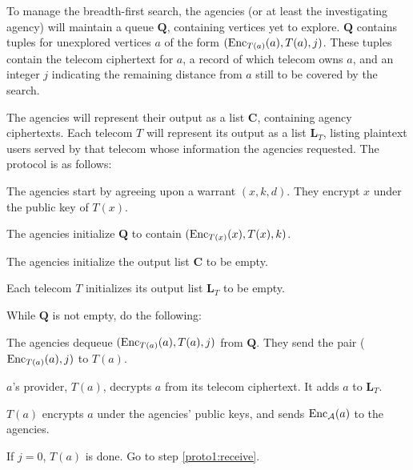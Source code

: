 To manage the breadth-first search, the agencies (or at least the investigating agency) will maintain a queue $\mathbf{Q}$, containing vertices yet to explore. $\mathbf{Q}$ contains tuples for unexplored vertices $a$ of the form $(\operatorname{Enc}_{T(a)}(a), T(a), j)$. These tuples contain the telecom ciphertext for $a$, a record of which telecom owns $a$, and an integer $j$ indicating the remaining distance from $a$ still to be covered by the search.

The agencies will represent their output as a list $\mathbf{C}$, containing agency ciphertexts. Each telecom $T$ will represent its output as a list $\mathbf{L}_T$, listing plaintext users served by that telecom whose information the agencies requested.  The protocol is as follows:

\begin{compactenum}

\item The agencies start by agreeing upon a warrant $(x, k, d)$. 
They encrypt $x$ under the public key of $T(x)$.

\item The agencies initialize $\mathbf{Q}$ to contain 
$(\operatorname{Enc}_{T(x)}(x), T(x), k)$.

\item The agencies initialize the output list $\mathbf{C}$ to be empty.

\item Each telecom $T$ initializes its output list $\mathbf{L}_T$ to be empty.

\item While $\mathbf{Q}$ is not empty, do the following:

\begin{compactenum}

\item \label{proto1:top-of-loop} The agencies dequeue $(\operatorname{Enc}_{T(a)}(a), T(a), j)$ from $\mathbf{Q}$. They send the pair ($\operatorname{Enc}_{T(a)}(a), j)$ to $T(a)$.

\item $a$'s provider, $T(a)$, decrypts $a$ from its telecom ciphertext. It adds $a$ to $\mathbf{L}_T$.

\item \label{proto1:first-send} $T(a)$ encrypts $a$ under the agencies' public keys, and sends $\operatorname{Enc}_\mathcal{A}(a)$ to the agencies.

\item If $j=0$, $T(a)$ is done. Go to step \ref{proto1:receive}.


\end{compactenum}
\end{compactenum}
